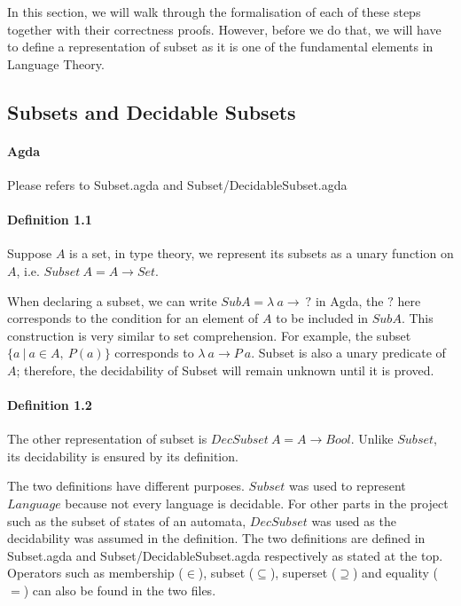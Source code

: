 \documentclass[twoside,openright,final]{bhamthesis}
\begin{document}
\par In this section, we will walk through the formalisation of
each of these steps together with their correctness proofs. However,
before we do that, we will have to define a
representation of subset as it is one of the fundamental elements in
Language Theory.

\subsection{Subsets and Decidable Subsets}
\paragraph{Agda} Please refers to Subset.agda and Subset/DecidableSubset.agda

\paragraph{Definition 1.1} Suppose \(A\) is a set, in type theory, we represent its subsets as a unary function on
\(A\), i.e. \(Subset\ A = A \to Set\). \\

\par When declaring a subset, we can write \(SubA =
\lambda\ a \to\ ?\) in Agda, the \(?\) here corresponds to the
condition for an element of \(A\) to be included in \(SubA\). This construction is
very similar to set comprehension. For example, the subset 
\(\{a\ | \ a \in A,\ P(a)\}\) corresponds to \(\lambda\ a \to P\
a\). Subset is also a unary predicate of \(A\); therefore, the decidability of Subset will remain
unknown until it is proved. 

\paragraph{Definition 1.2} The other representation of subset is \(DecSubset\ A = A \to
Bool\). Unlike \(Subset\), its decidability is ensured by its
definition. \\

\par The two definitions have different purposes. \(Subset\) was used to represent \(Language\) because not every
language is decidable. For other parts in the project 
such as the subset of states of an automata, \(DecSubset\) was used
as the decidability was assumed in the definition. The two definitions
are defined in Subset.agda and Subset/DecidableSubset.agda
respectively as stated at the top. Operators such as membership (\(\in\)), subset
(\(\subseteq\)), superset (\(\supseteq\)) and equality (\(=\)) can
also be found in the two files. 
\end{document}
